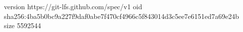 version https://git-lfs.github.com/spec/v1
oid sha256:4ba5b0bc9a227f9daf0abe7f470cf4966c5f843014d3c5ee7e6151ed7a69e24b
size 5592544
